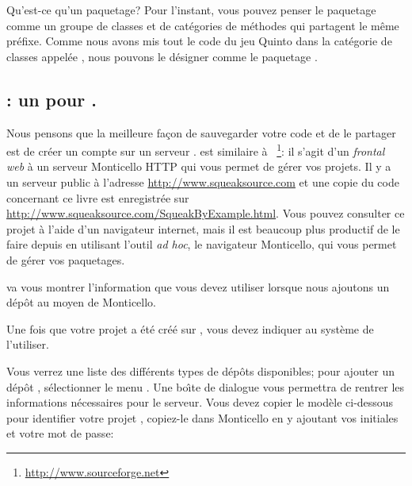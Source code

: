 \documentclass[a4paper,10pt,twoside]{book}
\begin{document}
Qu'est-ce qu'un paquetage? Pour l'instant, vous pouvez penser le paquetage comme un groupe de classes et de catégories de méthodes qui partagent le même préfixe. Comme nous avons mis tout le code du jeu Quinto dans la catégorie de classes appelée , nous pouvons le désigner comme le paquetage .


\subsection{\ind{\squeaksource}: un  pour \sq.} 
Nous pensons que la meilleure façon de sauvegarder votre code et de le
partager est de créer un compte sur un serveur
\squeaksource. \squeaksource est similaire à
\sourceforge~\footnote{\url{http://www.sourceforge.net}}: il s'agit d'un
\emph{frontal web} à un serveur Monticello HTTP qui vous permet de gérer vos projets.
Il y a un serveur public \squeaksource à l'adresse
\url{http://www.squeaksource.com} et une copie du code concernant ce
livre est enregistrée sur
\url{http://www.squeaksource.com/SqueakByExample.html}. Vous pouvez
consulter ce projet à l'aide d'un navigateur internet, mais il est
beaucoup plus productif de le faire depuis \sq en utilisant
l'outil \emph{ad hoc}, le navigateur Monticello, qui vous permet de
gérer vos paquetages.

\squeaksource va vous montrer l'information que vous devez utiliser
lorsque nous ajoutons un dépôt au moyen de Monticello.

Une fois que votre projet a été créé sur \squeaksource, vous devez indiquer au système \sq de l'utiliser.

  Vous
verrez une liste des différents types de dépôts disponibles; pour
ajouter un dépôt \squeaksource, sélectionner le menu . Une
bo\^{\i}te de dialogue vous permettra de rentrer les informations
nécessaires pour le serveur.
Vous devez copier le modèle ci-dessous pour identifier votre projet
\squeaksource, copiez-le dans Monticello en y ajoutant vos initiales
et votre mot de passe:
\end{document}
